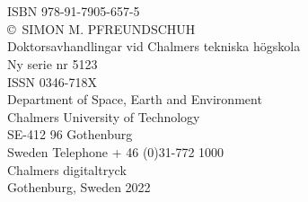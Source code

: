 \thispagestyle{plain}
\vspace*{5cm}

\noindent\textbf{\thetitle}\\[0.2cm]
%
\nodindent \theauthor \\
ISBN 978-91-7905-657-5\\[0.5cm]

\noindent \copyright \ {\sc SIMON M. PFREUNDSCHUH} \\[0.5cm]



\noindent Doktorsavhandlingar vid Chalmers tekniska högskola \\
Ny serie nr 5123  \\
ISSN 0346-718X  \\[0.5cm]

\noindent Department of Space, Earth and Environment \\
Chalmers University of Technology  \\
SE-412 96 Gothenburg  \\
Sweden 
Telephone + 46 (0)31-772 1000  \\[2cm]

\noindent Chalmers digitaltryck  \\
\noindent Gothenburg, Sweden 2022 

\clearpage
